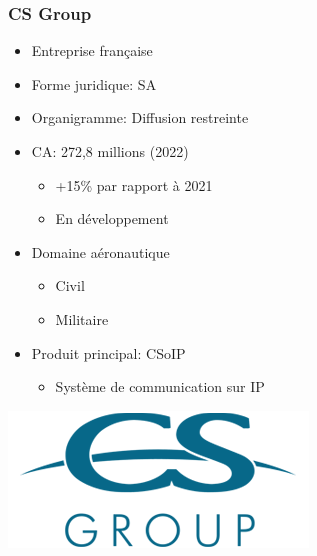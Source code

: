 \begin{frame}
    \frametitle{CS Group}
    \begin{itemize}
        \item Entreprise française
        \item Forme juridique: SA
        \item Organigramme: Diffusion restreinte
        \item CA: 272,8 millions (2022)
            \begin{itemize}
                \item +15\% par rapport à 2021
                \item En développement
            \end{itemize}
        \item Domaine aéronautique
            \begin{itemize}
                \item Civil
                \item Militaire
            \end{itemize}
        \item Produit principal: CSoIP
            \begin{itemize}
                \item Système de communication sur IP
            \end{itemize}
    \end{itemize}
    \begin{center}
        \includegraphics{./img/logo-CSGROUP.png}
    \end{center}
\end{frame}